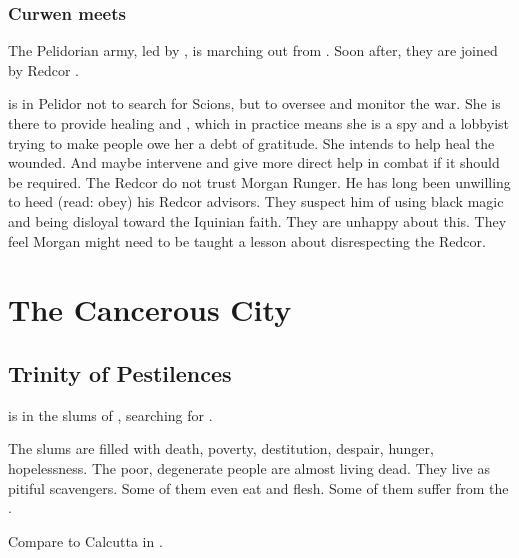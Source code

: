 \subsubsection{Curwen meets \Esmerel}
The Pelidorian army, led by , is marching out from \Malcur. 
Soon after, they are joined by Redcor \Matron{} \Esmerel. 

\Esmerel{} is in Pelidor not to search for Scions, but to oversee and monitor the war. 
She is there to provide healing and , which in practice means she is a spy and a lobbyist trying to make people owe her a debt of gratitude. 
She intends to help heal the wounded. 
And maybe intervene and give more direct help in combat if it should be required. 
The Redcor do not trust Morgan Runger. 
He has long been unwilling to heed (read: obey) his Redcor advisors. 
They suspect him of using black magic and being disloyal toward the Iquinian faith. 
They are unhappy about this. 
They feel Morgan might need to be taught a lesson about disrespecting the Redcor. 















\section{The Cancerous City}







\subsection{Trinity of Pestilences}
 is in the slums of \Malcur, searching for . 

The slums are filled with death, poverty, destitution, despair, hunger, hopelessness. 
The poor, degenerate people are almost living dead. 
They live as pitiful scavengers. 
Some of them even eat \human{} and \scathaese{} flesh. 
Some of them suffer from the . 

Compare to Calcutta in \cite{PoppyZBrite:CalcuttaLordofNerves}. 







